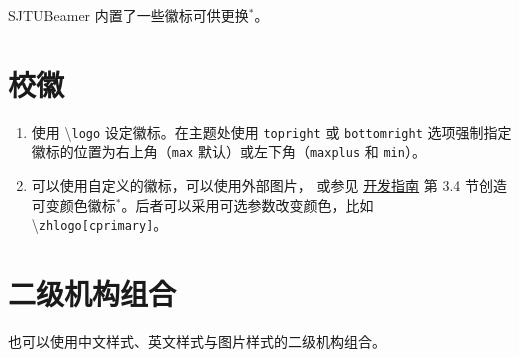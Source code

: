 \documentclass[
    UTF8,
    heading=true,
    12pt,
    a4paper
]{ctexrep}
\newenvironment{commentlist}
{\begin{enumerate}\small}
{\end{enumerate}}
\newcommand{\cmd}[1]{\textbackslash{}\texttt{#1}}
\newcommand{\opt}[1]{\texttt{#1}}
\def\themename{\textsf{SJTUBeamer}}
\begin{document}
\themename{} 内置了一些徽标可供更换$^*$。

\section{校徽}

\begin{tcbitemize}[raster rows=2, raster
    columns=3, raster every box/.style={
        center title,
        valign=center,
        halign=center,
        fonttitle=\ttfamily,
        colback=white}]
  \tcbitem[raster multicolumn=2,blankest]
  \begin{tcbitemize}[raster columns=2]
    \tcbitem[title={\cmd{zhlogo}}]
    \hbox{\resizebox{!}{1cm}{\zhlogo}}

    \tcbitem[title={\cmd{enlogo}}]
    \hbox{\resizebox{!}{1cm}{\enlogo}}

    \tcbitem[title={\cmd{sjtubadge}},height=3.5cm]
    \resizebox{!}{2cm}{\sjtubadge{}}

    \tcbitem[title={\cmd{dlogo}},height=3.5cm]
    \resizebox{3cm}{!}{\dlogo{}}
  \end{tcbitemize}
  \tcbitem[title={\cmd{vlogo}}]
  \resizebox{!}{4.8cm}{\vlogo{}}
\end{tcbitemize}


\begin{commentlist}
  \item 使用 \cmd{logo} 设定徽标。在主题处使用 \opt{topright}
  或 \opt{bottomright} 选项强制指定徽标的位置为右上角（\opt{max}
  默认）或左下角（\opt{maxplus} 和 \opt{min}）。
  \item 可以使用自定义的徽标，可以使用外部图片，
  或参见 \href{run:sjtubeamerdevguide.pdf}{开发指南}
  第 3.4 节创造可变颜色徽标$^*$。后者可以采用可选参数改变颜色，比如
  \cmd{zhlogo[cprimary]}。
\end{commentlist}

\section{二级机构组合}

也可以使用中文样式、英文样式与图片样式的二级机构组合。
\end{document}
